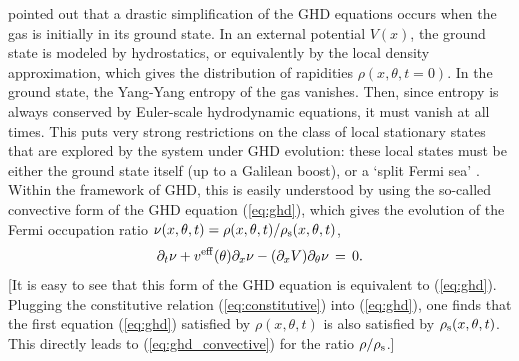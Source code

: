\documentclass[onecolumn,amsfonts,showpacs,superscriptaddress]{revtex4-1}
\begin{document}
\cite{doyon2017large} pointed out that a drastic simplification of the GHD equations occurs when the gas is initially in its ground state. In an external potential $V(x)$, the ground state is modeled by hydrostatics, or equivalently by the local density approximation, which gives the distribution of rapidities $\rho(x,\theta, t=0)$. In the ground state, the Yang-Yang entropy of the gas vanishes. Then, since entropy is always conserved by Euler-scale hydrodynamic equations, it must vanish at all times. This puts very strong restrictions on the class of local stationary states that are explored by the system under GHD evolution: these local states must be either the ground state itself (up to a Galilean boost), or a `split Fermi sea' \citep{fokkema2014split,eliens2016general,eliens2017quantum}. Within the framework of GHD, this is easily understood by using the so-called convective form of the GHD equation (\ref{eq:ghd}), which gives the evolution of the Fermi occupation ratio $\nu(x,\theta,t)=\rho(x,\theta,t)/\rho_{\rm s}(x,\theta,t)$,
\begin{equation}
    \label{eq:ghd_convective}
    \partial_t \nu +  v^{\rm eff} (\theta) \partial_x \nu - (\partial_x V) \partial_\theta \nu  \, = \,  0 .
\end{equation}
[It is easy to see that this form of the GHD equation is equivalent to (\ref{eq:ghd}). Plugging the constitutive relation (\ref{eq:constitutive}) into  (\ref{eq:ghd}), one finds that the first equation (\ref{eq:ghd}) satisfied by $\rho(x,\theta,t)$ is also satisfied by $\rho_{\rm s}(x,\theta,t)$. This directly leads to (\ref{eq:ghd_convective}) for the ratio $\rho/\rho_{\rm s}$.] 
\end{document}
